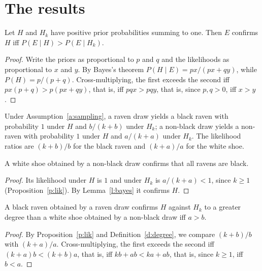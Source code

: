 \documentclass{situationist-preprint}
\begin{document}
\section{The results}

\begin{lemma}\label{l:bayes}
Let $H$ and $H_k$ have positive prior probabilities summing to one. Then $E$ confirms $H$ iff $P(E \mid H) > P(E \mid H_k)$.
\end{lemma}

\begin{proof}
Write the priors as proportional to $p$ and $q$ and the likelihoods as proportional to $x$ and $y$. By Bayes's theorem $P(H \mid E) = px/(px + qy)$, while $P(H) = p/(p+q)$. Cross-multiplying, the first exceeds the second iff $px(p+q) > p(px+qy)$, that is, iff $pqx > pqy$, that is, since $p, q > 0$, iff $x > y$.
\end{proof}

\begin{proposition}\label{p:lik}
Under Assumption~\ref{a:sampling}, a raven draw yields a black raven with probability $1$ under $H$ and $b/(k+b)$ under $H_k$; a non-black draw yields a non-raven with probability $1$ under $H$ and $a/(k+a)$ under $H_k$. The likelihood ratios are $(k+b)/b$ for the black raven and $(k+a)/a$ for the white shoe.
\end{proposition}

\begin{theorem}\label{t:shoe}
A white shoe obtained by a non-black draw confirms that all ravens are black.
\end{theorem}

\begin{proof}
Its likelihood under $H$ is $1$ and under $H_k$ is $a/(k+a) < 1$, since $k \geq 1$ (Proposition~\ref{p:lik}). By Lemma~\ref{l:bayes} it confirms $H$.
\end{proof}

\begin{theorem}\label{t:compare}
A black raven obtained by a raven draw confirms $H$ against $H_k$ to a greater degree than a white shoe obtained by a non-black draw iff $a > b$.
\end{theorem}

\begin{proof}
By Proposition~\ref{p:lik} and Definition~\ref{d:degree}, we compare $(k+b)/b$ with $(k+a)/a$. Cross-multiplying, the first exceeds the second iff $(k+a)b < (k+b)a$, that is, iff $kb + ab < ka + ab$, that is, since $k \geq 1$, iff $b < a$.
\end{proof}
\end{document}
